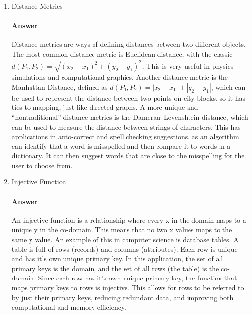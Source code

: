 \documentclass{article}
\begin{document}
\begin{enumerate}
    \item Distance Metrics

        \paragraph{Answer}

        Distance metrics are ways of defining distances between two different objects. The most common distance metric is Euclidean distance, with the classic $d(P_1, P_2) = \sqrt{(x_2-x_1)^2+(y_2-y_1)^2}$. This is very useful in physics simulations and computational graphics. Another distance metric is the Manhattan Distance, defined as $d(P_1, P_2) = |x_2-x_1|+|y_2-y_1|$, which can be used to represent the distance between two points on city blocks, so it has ties to mapping, just like directed graphs. A more unique and ``nontraditional'' distance metrics is the Damerau–Levenshtein distance, which can be used to measure the distance between strings of characters. This has applications in auto-correct and spell checking suggestions, as an algorithm can identify that a word is misspelled and then compare it to words in a dictionary. It can then suggest words that are close to the misspelling for the user to choose from.

    \item Injective Function

        \paragraph{Answer}

        An injective function is a relationship where every x in the domain maps to a unique y in the co-domain. This means that no two x values maps to the same y value. An example of this in computer science is database tables. A table is full of rows (records) and columns (attributes). Each row is unique and has it's own unique primary key. In this application, the set of all primary keys is the domain, and the set of all rows (the table) is the co-domain. Since each row has it's own unique primary key, the function that maps primary keys to rows is injective. This allows for rows to be referred to by just their primary keys, reducing redundant data, and improving both computational and memory efficiency.


\end{enumerate}


 
\end{document}
